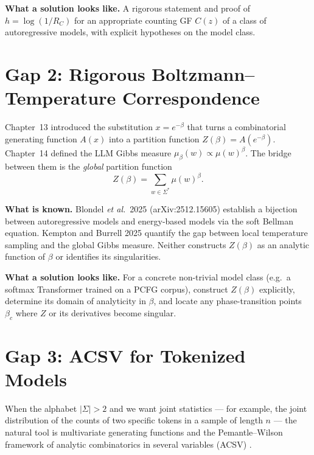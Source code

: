\textbf{What a solution looks like.} A rigorous statement and proof of $h=\log(1/R_C)$ for an appropriate counting GF $C(z)$ of a class of autoregressive models, with explicit hypotheses on the model class.

\section{Gap 2: Rigorous Boltzmann--Temperature Correspondence}
\label{ch18:gap2}

Chapter~13 introduced the substitution $x=e^{-\beta}$ that turns a combinatorial generating function $A(x)$ into a partition function $Z(\beta)=A(e^{-\beta})$. Chapter~14 defined the LLM Gibbs measure $\mu_\beta(w)\propto\mu(w)^\beta$. The bridge between them is the \emph{global} partition function
$$
Z(\beta)=\sum_{w\in\Sigma^*}\mu(w)^\beta.
$$

\textbf{What is known.} Blondel \emph{et al.}\ 2025 \cite{BlondelEtAl2025} (arXiv:2512.15605) establish a bijection between autoregressive models and energy-based models via the soft Bellman equation. Kempton and Burrell 2025 \cite{KemptonBurrell2025} quantify the gap between local temperature sampling and the global Gibbs measure. Neither constructs $Z(\beta)$ as an analytic function of $\beta$ or identifies its singularities.

\textbf{What a solution looks like.} For a concrete non-trivial model class (e.g.\ a softmax Transformer trained on a PCFG corpus), construct $Z(\beta)$ explicitly, determine its domain of analyticity in $\beta$, and locate any phase-transition points $\beta_c$ where $Z$ or its derivatives become singular.

\section{Gap 3: ACSV for Tokenized Models}
\label{ch18:gap3}

When the alphabet $|\Sigma|>2$ and we want joint statistics --- for example, the joint distribution of the counts of two specific tokens in a sample of length $n$ --- the natural tool is multivariate generating functions and the Pemantle--Wilson framework of analytic combinatorics in several variables (ACSV) \cite{PemantleWilson2013}.

